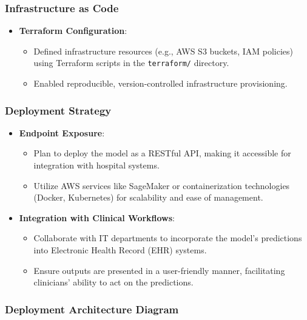 \documentclass{article}
\begin{document}
\subsubsection{Infrastructure as Code}

\begin{itemize}[leftmargin=*]
    \item \textbf{Terraform Configuration}:
        \begin{itemize}[leftmargin=*]
            \item Defined infrastructure resources (e.g., AWS S3 buckets, IAM policies) using Terraform scripts in the \texttt{terraform/} directory.
            \item Enabled reproducible, version-controlled infrastructure provisioning.
        \end{itemize}
\end{itemize}

\subsubsection{Deployment Strategy}

\begin{itemize}[leftmargin=*]
    \item \textbf{Endpoint Exposure}:
        \begin{itemize}[leftmargin=*]
            \item Plan to deploy the model as a RESTful API, making it accessible for integration with hospital systems.
            \item Utilize AWS services like SageMaker or containerization technologies (Docker, Kubernetes) for scalability and ease of management.
        \end{itemize}
    \item \textbf{Integration with Clinical Workflows}:
        \begin{itemize}[leftmargin=*]
            \item Collaborate with IT departments to incorporate the model's predictions into Electronic Health Record (EHR) systems.
            \item Ensure outputs are presented in a user-friendly manner, facilitating clinicians' ability to act on the predictions.
        \end{itemize}
\end{itemize}

\subsubsection{Deployment Architecture Diagram}
\end{document}
